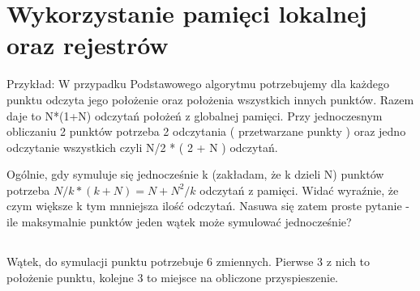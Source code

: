 
\section { Wykorzystanie pamięci lokalnej oraz rejestrów }




Przykład:
W przypadku Podstawowego algorytmu potrzebujemy dla każdego punktu odczyta jego położenie oraz położenia wszystkich innych punktów. Razem daje to N*(1+N) odczytań położeń z globalnej pamięci. Przy jednoczesnym obliczaniu 2 punktów potrzeba 2 odczytania ( przetwarzane punkty ) oraz jedno odczytanie wszystkich czyli N/2  * ( 2 + N ) odczytań.

Ogólnie, gdy symuluje się jednocześnie k (zakładam, że k dzieli N) punktów potrzeba $N/k * (k + N) = N + N^2/k$ odczytań z pamięci. Widać wyraźnie, że czym większe k tym mnniejsza ilość odczytań. Nasuwa się zatem proste pytanie - ile maksymalnie punktów jeden wątek może symulować jednocześnie?

\subsection{}

Wątek, do symulacji punktu potrzebuje 6 zmiennych. Pierwse 3 z nich to położenie punktu, kolejne 3 to miejsce na obliczone przyspieszenie.
